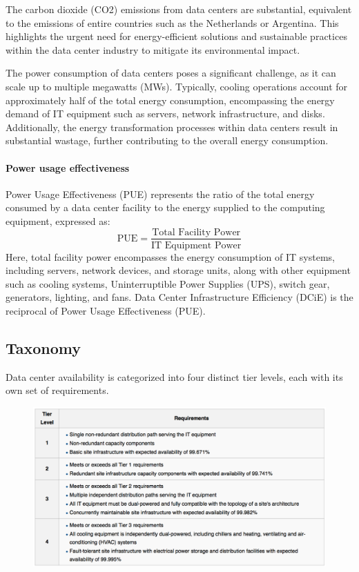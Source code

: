 The carbon dioxide (CO2) emissions from data centers are substantial, equivalent to the emissions of entire countries such as the Netherlands or Argentina. 
This highlights the urgent need for energy-efficient solutions and sustainable practices within the data center industry to mitigate its environmental impact.

The power consumption of data centers poses a significant challenge, as it can scale up to multiple megawatts (MWs). 
Typically, cooling operations account for approximately half of the total energy consumption, encompassing the energy demand of IT equipment such as servers, network infrastructure, and disks. 
Additionally, the energy transformation processes within data centers result in substantial wastage, further contributing to the overall energy consumption.

\paragraph*{Power usage effectiveness}
Power Usage Effectiveness (PUE) represents the ratio of the total energy consumed by a data center facility to the energy supplied to the computing equipment, expressed as:
\[\text{PUE}=\dfrac{\text{Total Facility Power}}{\text{IT Equipment Power}}\]
Here, total facility power encompasses the energy consumption of IT systems, including servers, network devices, and storage units, along with other equipment such as cooling systems, Uninterruptible Power Supplies (UPS), switch gear, generators, lighting, and fans.
Data Center Infrastructure Efficiency (DCiE) is the reciprocal of Power Usage Effectiveness (PUE).

\subsection{Taxonomy}
Data center availability is categorized into four distinct tier levels, each with its own set of requirements.
\begin{figure}[H]
    \centering
    \includegraphics[width=1\linewidth]{images/tax.png}
\end{figure}